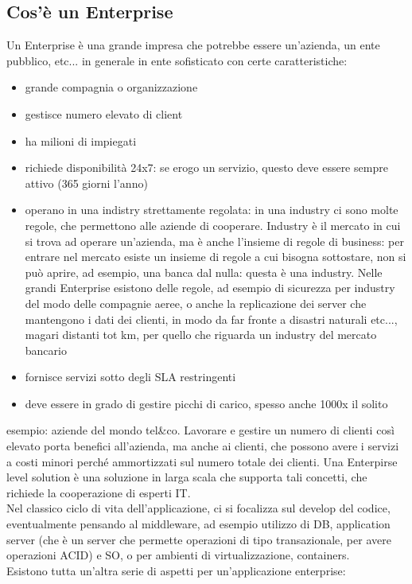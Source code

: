 \documentclass{article}
\begin{document}
\subsection{Cos'è un Enterprise}
Un Enterprise è una grande impresa che potrebbe essere un'azienda, un ente pubblico, etc... in generale in ente sofisticato con certe caratteristiche:
\begin{itemize}
\item grande compagnia o organizzazione
\item gestisce numero elevato di client
\item ha milioni di impiegati
\item richiede disponibilità 24x7: se erogo un servizio, questo deve essere sempre attivo (365 giorni l'anno)
\item operano in una indistry strettamente regolata: in una industry ci sono molte regole, che permettono alle aziende di cooperare. Industry è il mercato in cui si trova ad operare un'azienda, ma è anche l'insieme di regole di business: per entrare nel mercato esiste un insieme di regole a cui bisogna sottostare, non si può aprire, ad esempio, una banca dal nulla: questa è una industry. Nelle grandi Enterprise esistono delle regole, ad esempio di sicurezza per industry del modo delle compagnie aeree, o anche la replicazione dei server che mantengono i dati dei clienti, in modo da far fronte a disastri naturali etc..., magari distanti tot km, per quello che riguarda un industry del mercato bancario
\item fornisce servizi sotto degli SLA restringenti
\item deve essere in grado di gestire picchi di carico, spesso anche 1000x il solito
\end{itemize}
esempio: aziende del mondo tel\&co. Lavorare e gestire un numero di clienti così elevato porta benefici all'azienda, ma anche ai clienti, che possono avere i servizi a costi minori perché ammortizzati sul numero totale dei clienti. Una Enterpirse level solution è una soluzione in larga scala che supporta tali concetti, che richiede la cooperazione di esperti IT.\\ Nel classico ciclo di vita dell'applicazione, ci si focalizza sul develop del codice, eventualmente pensando al middleware, ad esempio utilizzo di DB, application server (che è un server che permette operazioni di tipo transazionale, per avere operazioni ACID) e SO, o per ambienti di virtualizzazione, containers.\\ Esistono tutta un'altra serie di aspetti per un'applicazione enterprise:
\end{document}
